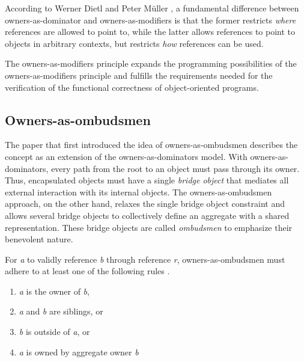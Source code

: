 \documentclass[sigplan,11pt,nonacm]{acmart}
\begin{document}
According to Werner Dietl and Peter Müller \cite{lightweight-ownership}, a fundamental difference between owners-as-dominator and owners-as-modifiers is that the former restricts \emph{where} references are allowed to point to, while the latter allows references to point to objects in arbitrary contexts, but restricts \emph{how} references can be used.

The owners-as-modifiers principle expands the programming possibilities of the owners-as-modifiers principle and fulfills the requirements needed for the verification of the functional correctness of object-oriented programs.


\subsection{Owners-as-ombudsmen}
\label{sec:owners-as-ombudsmen}

The paper that first introduced the idea of owners-as-ombudsmen \cite{owners-as-ombudsmen} describes the concept as an extension of the owners-as-dominators model.
With owners-as-dominators, every path from the root to an object must pass through its owner.
Thus, encapsulated objects must have a single \emph{bridge object} that mediates all external interaction with its internal objects.
The owners-as-ombudsmen approach, on the other hand, relaxes the single bridge object constraint and allows several bridge objects to collectively define an aggregate with a shared representation.
These bridge objects are called \emph{ombudsmen} to emphasize their benevolent nature.


For \emph{a} to validly reference \emph{b} through reference \emph{r}, owners-as-ombudsmen must adhere to at least one of the following rules \cite{ownership-types-survey}.
\begin{enumerate}
  \item \emph{a} is the owner of \emph{b},
  \item \emph{a} and \emph{b} are siblings, or
  \item \emph{b} is outside of \emph{a}, or
  \item \emph{a} is owned by aggregate owner \emph{b}
\end{enumerate}
\end{document}
